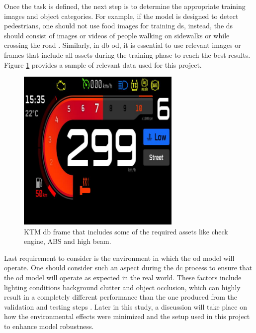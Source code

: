 Once the task is defined, the next step is to determine the appropriate training images and object categories. For example, if the model is designed to detect pedestrians, one should not use food images for training \gls{ds}, instead, the \gls{ds} should consist of images or videos of people walking on sidewalks or while crossing the road \cite{AIMultiple_Computer_Vision_Training_Data}. Similarly, in \gls{db} \gls{od}, it is essential to use relevant images or frames that include all assets during the training phase to reach the best results. Figure \ref{KTM_DB_Unlabelled} provides a sample of relevant data used for this project.

\begin{figure}[!htb] 
    \centering
    \includegraphics[width=0.7\textwidth]{Figures/Training_Sample_1.jpg}
    \caption{KTM \gls{db} frame that includes some of the required assets like check engine, ABS and high beam.}
    \label{KTM_DB_Unlabelled}
\end{figure}

Last requirement to consider is the environment in which the \gls{od} model will operate. One should consider such an aspect during the \gls{dc} process to ensure that the \gls{od} model will operate as expected in the real world. These factors include lighting conditions background clutter and object occlusion, which can highly result in a completely different performance than the one produced from the validation and testing steps \cite{AIMultiple_Computer_Vision_Training_Data}. Later in this study, a discussion will take place on how the environmental effects were minimized and the setup used in this project to enhance model robustness.

